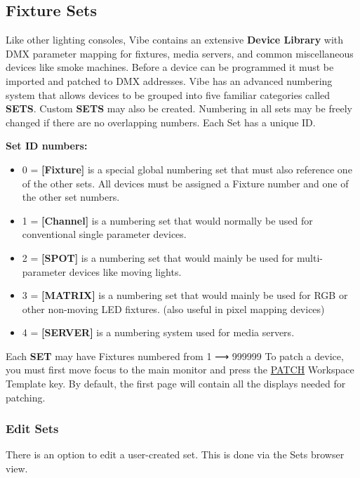 \documentclass[
]{article}
\providecommand{\tightlist}{%
  \setlength{\itemsep}{0pt}\setlength{\parskip}{0pt}}
\begin{document}
\hypertarget{fixture-sets}{%
\subsection{Fixture Sets}\label{fixture-sets}}

Like other lighting consoles, Vibe contains an extensive \textbf{Device Library} with DMX parameter mapping for fixtures, media servers, and common miscellaneous devices like smoke machines. Before a device can be programmed it must be imported and patched to DMX addresses. Vibe has an advanced numbering system that allows devices to be grouped into five familiar categories called \textbf{SETS}. Custom \textbf{SETS} may also be created. Numbering in all sets may be freely changed if there are no overlapping numbers. Each Set has a unique ID.

\textbf{Set ID numbers:}

\begin{itemize}
\tightlist
\item
  0 = \textbf{{[}Fixture{]}} is a special global numbering set that must also reference one of the other sets. All devices must be assigned a Fixture number and one of the other set numbers.
\item
  1 = \textbf{{[}Channel{]}} is a numbering set that would normally be used for conventional single parameter devices.
\item
  2 = \textbf{{[}SPOT{]}} is a numbering set that would mainly be used for multi-parameter devices like moving lights.
\item
  3 = \textbf{{[}MATRIX{]}} is a numbering set that would mainly be used for RGB or other non-moving LED fixtures. (also useful in pixel mapping devices)
\item
  4 = \textbf{{[}SERVER{]}} is a numbering system used for media servers.
\end{itemize}

Each \textbf{SET} may have Fixtures numbered from 1 ⟶ 999999 To patch a device, you must first move focus to the main monitor and press the \protect\hyperlink{patch}{PATCH} Workspace Template key. By default, the first page will contain all the displays needed for patching.

\hypertarget{edit-sets}{%
\subsubsection{Edit Sets}\label{edit-sets}}

There is an option to edit a user-created set. This is done via the Sets browser view.
\end{document}
